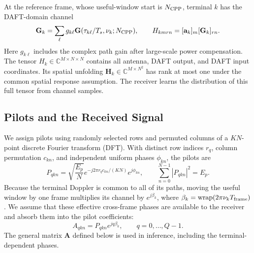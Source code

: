 \documentclass[10pt,a4paper]{article}
\begin{document}
At the reference frame, whose useful-window start is $N_{\rm CPP}$,
terminal $k$ has the DAFT-domain channel
\begin{equation}
 \mathbf{G}_k=\sum_{\ell}g_{k\ell}
 \mathbf{G}(\tau_{k\ell}/T_s,\nu_k;N_{\rm CPP}),
 \qquad H_{kmrn}=[\mathbf{a}_k]_m[\mathbf{G}_k]_{rn}.
 \label{eq:channel}
\end{equation}
Here $g_{k\ell}$ includes the complex path gain after large-scale power
compensation. The tensor $H_k\in\mathbb{C}^{M\times N\times N}$ contains
all antenna, DAFT output, and DAFT input coordinates. Its spatial unfolding
$\mathbf{H}_k\in\mathbb{C}^{M\times N^2}$ has rank at most one under the
common spatial response assumption. The receiver learns the distribution
of this full tensor from channel samples.

\subsection{Pilots and the Received Signal}

We assign pilots using randomly selected rows and permuted columns of a
$KN$-point discrete Fourier transform (DFT). With distinct row indices
$r_q$, column permutation $c_{kn}$, and independent uniform phases
$\phi_{kn}$, the pilots are
\begin{equation}
 P_{qkn}=\sqrt{\frac{E_p}{N}}
 e^{-j2\pi r_qc_{kn}/(KN)}e^{j\phi_{kn}},
 \qquad \sum_{n=0}^{N-1}|P_{qkn}|^2=E_p.
 \label{eq:pilot}
\end{equation}
Because the terminal Doppler is common to all of its paths, moving the
useful window by one frame multiplies its channel by $e^{j\beta_k}$,
where $\beta_k=\operatorname{wrap}(2\pi\nu_kT_{\rm frame})$. We assume
that these effective cross-frame phases are available to the receiver and
absorb them into the pilot coefficients:
\begin{equation}
 A_{qkn}=P_{qkn}e^{jq\beta_k},\qquad q=0,\ldots,Q-1.
 \label{eq:effective-pilot}
\end{equation}
The general matrix $\mathbf{A}$ defined below is used in inference,
including the terminal-dependent phases.
\end{document}
